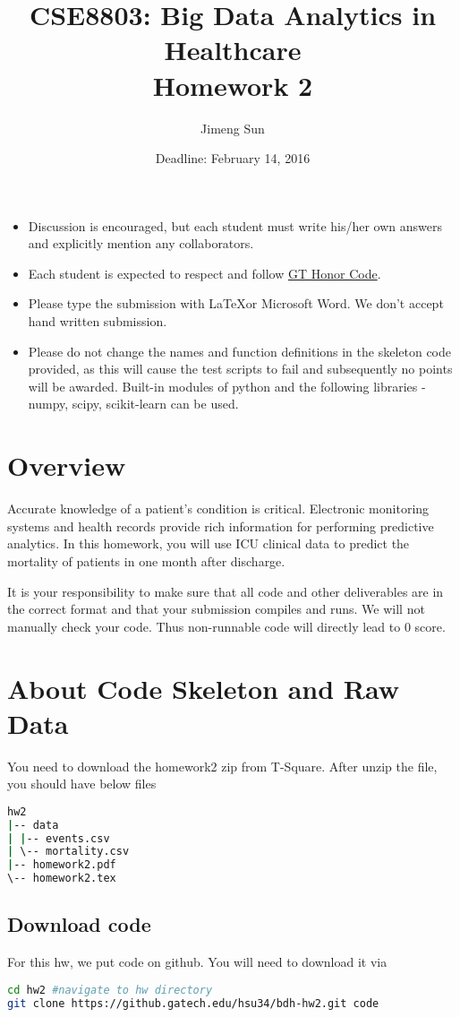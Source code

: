 \documentclass[12pt]{article}
\title{CSE8803: Big Data Analytics in Healthcare \\ Homework 2}
\author{Jimeng Sun}
\date{Deadline: February 14, 2016}
\begin{document}
\maketitle
\begin{itemize}
\item Discussion is encouraged, but each student must write his/her own answers and explicitly mention any collaborators.
\item Each student is expected to respect and follow \href{http://www.honor.gatech.edu/}{ GT Honor Code}.
\item Please type the submission with \LaTeX or Microsoft Word. We don't accept hand written submission.
\item Please do not change the names and function definitions in the skeleton code provided,  as  this  will  cause  the  test  scripts  to  fail  and  subsequently  no  points  will  be awarded. Built-in  modules  of  python  and  the  following  libraries - numpy, scipy, scikit-learn can be used.
\end{itemize}

\section*{Overview}
Accurate knowledge of a patient's condition is critical. Electronic monitoring systems and health records provide rich information for performing predictive analytics. In this homework, you will use ICU clinical data to predict the mortality of patients in one month after discharge.

It is your responsibility to make sure that all code and other deliverables are in the correct format and that your submission compiles and runs.  We will not manually check your code. Thus non-runnable code will directly lead to 0 score.

\newpage
\section*{About Code Skeleton and Raw Data}
You need to download the homework2 zip from T-Square. After unzip the file, you should have below files
\begin{lstlisting}[frame=single, language=bash]
hw2
|-- data
| |-- events.csv
| \-- mortality.csv
|-- homework2.pdf
\-- homework2.tex
\end{lstlisting}
\subsection*{Download code}
For this hw, we put code on github. You will need to download it via
\begin{lstlisting}[frame=single, language=bash]
cd hw2 #navigate to hw directory
git clone https://github.gatech.edu/hsu34/bdh-hw2.git code
\end{lstlisting}
\end{document}
